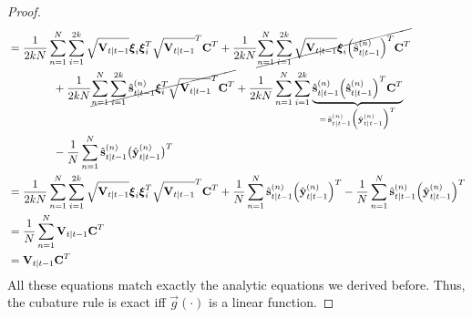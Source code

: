\begin{proof}
\begin{align*}
					&= \frac{1}{2kN} \sum_{n = 1}^{N} \sum_{i = 1}^{2k} \sqrt{\boldsymbol{\mathrm{V}}_{t \vert t - 1}} \boldsymbol{\mathrm{\xi}}_i \boldsymbol{\mathrm{\xi}}_i^T \sqrt{\boldsymbol{\mathrm{V}}_{t \vert t - 1}}^T \boldsymbol{\mathrm{C}}^T + \frac{1}{2kN} \cancel{\sum_{n = 1}^{N} \sum_{i = 1}^{2k} \sqrt{\boldsymbol{\mathrm{V}}_{t \vert t - 1}} \boldsymbol{\mathrm{\xi}}_i \Big(\hat{\boldsymbol{\mathrm{s}}}_{t \vert t - 1}^{(n)}\Big)^T \boldsymbol{\mathrm{C}}^T} \\
						&\qquad\qquad + \frac{1}{2kN} \cancel{\sum_{n = 1}^{N} \sum_{i = 1}^{2k} \hat{\boldsymbol{\mathrm{s}}}_{t \vert t - 1}^{(n)} \boldsymbol{\mathrm{\xi}}_i^T \sqrt{\boldsymbol{\mathrm{V}}_{t \vert t - 1}}^T \boldsymbol{\mathrm{C}}^T} + \frac{1}{2kN} \sum_{n = 1}^{N} \sum_{i = 1}^{2k} \underbrace{\hat{\boldsymbol{\mathrm{s}}}_{t \vert t - 1}^{(n)} \Big(\hat{\boldsymbol{\mathrm{s}}}_{t \vert t - 1}^{(n)}\Big)^T \boldsymbol{\mathrm{C}}^T}_{=\, \hat{\boldsymbol{\mathrm{s}}}_{t \vert t - 1}^{(n)} \Big( \hat{\boldsymbol{\mathrm{y}}}_{t \vert t - 1}^{(n)} \Big)^T} \\
						&\qquad\qquad - \frac{1}{N} \sum_{n = 1}^{N} \hat{\boldsymbol{\mathrm{s}}}_{t \vert t - 1}^{(n)} \big( \hat{\boldsymbol{\mathrm{y}}}_{t \vert t - 1}^{(n)} \big)^T \\
					&= \frac{1}{2kN} \sum_{n = 1}^{N} \sum_{i = 1}^{2k} \sqrt{\boldsymbol{\mathrm{V}}_{t \vert t - 1}} \boldsymbol{\mathrm{\xi}}_i \boldsymbol{\mathrm{\xi}}_i^T \sqrt{\boldsymbol{\mathrm{V}}_{t \vert t - 1}}^T \boldsymbol{\mathrm{C}}^T + \frac{1}{N} \sum_{n = 1}^{N} \hat{\boldsymbol{\mathrm{s}}}_{t \vert t - 1}^{(n)} \Big( \hat{\boldsymbol{\mathrm{y}}}_{t \vert t - 1}^{(n)} \Big)^T - \frac{1}{N} \sum_{n = 1}^{N} \hat{\boldsymbol{\mathrm{s}}}_{t \vert t - 1}^{(n)} \Big( \hat{\boldsymbol{\mathrm{y}}}_{t \vert t - 1}^{(n)} \Big)^T \\
					&= \frac{1}{N} \sum_{n = 1}^{N} \boldsymbol{\mathrm{V}}_{t \vert t - 1} \boldsymbol{\mathrm{C}}^T \\
					&= \boldsymbol{\mathrm{V}}_{t \vert t - 1} \boldsymbol{\mathrm{C}}^T
			\end{align*}
			All these equations match exactly the analytic equations we derived before. Thus, the cubature rule is exact iff \(\vec{g}(\cdot)\) is a linear function.
		\end{proof}















